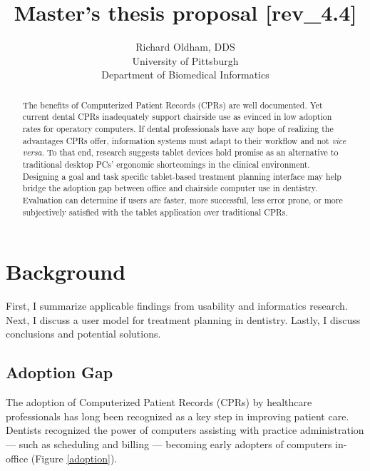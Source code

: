 \documentclass[11pt]{article}
\begin{document}
\title{Master's thesis proposal [rev\_4.4]} %
\author{\normalsize Richard Oldham, DDS \vspace{7pt} \\ 
		\small University of Pittsburgh \vspace{-2pt} \\
		\small Department of Biomedical Informatics}
\maketitle


\begin{abstract}
The benefits of Computerized Patient Records (CPRs) are well documented. Yet current dental CPRs inadequately support chairside use as evinced in low adoption rates for operatory computers. If dental professionals have any hope of realizing the advantages CPRs offer, information systems must adapt to their workflow and not \textit{vice versa}. To that end, research suggests tablet devices hold promise as an alternative to traditional desktop PCs' ergonomic shortcomings in the clinical environment. Designing a goal and task specific tablet-based treatment planning interface may help bridge the adoption gap between office and chairside computer use in dentistry. Evaluation can determine if users are faster, more successful, less error prone, or more subjectively satisfied with the tablet application over traditional CPRs.
\end{abstract}

\section{Background}
First, I summarize applicable findings from usability and informatics research. Next, I discuss a user model for treatment planning in dentistry. Lastly, I discuss conclusions and potential solutions.

\subsection{Adoption Gap}

The adoption of Computerized Patient Records (CPRs) by healthcare professionals has long been recognized as a key step in improving patient care\cite{Chasteen1992A-computer-data,Eisne1993The-computer-ba,Thompson2004The-Decade-of-H,Spicer2008Bytes-and-bites,Schleyer2011Advancing-oral}. Dentists recognized the power of computers assisting with practice administration --- such as scheduling and billing --- becoming early adopters of computers in-office (Figure \ref{adoption}).
\end{document}
